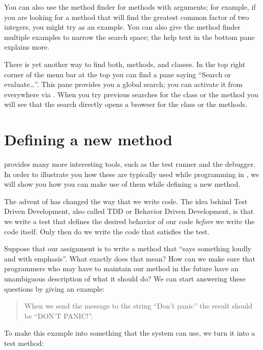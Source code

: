 \documentclass[a4paper,10pt,twoside]{book}
\begin{document}
You can also use the method finder for methods with arguments; for example, if you are looking for a method that will find the greatest common factor of two integers, you might try  as an example.
You can also give the method finder multiple examples to narrow the search space; the help text in the bottom pane explains more.

There is yet another way to find both, methods, and classes.
In the top right corner of the menu bar at the top you can find a pane saying ``Search or evaluate\ldots''.
This pane provides you a global search; you can activate it from everywhere via .
When you try previous searches for the class  or the method  you will see that the search directly opens a browser for the class or the methods.

\section{Defining a new method}

\sq provides many more interesting tools, such as the test runner and the debugger.
In order to illustrate you how these are typically used while programming in \sq, we will show you how you can make use of them while defining a new method.

The advent of \cite{Beck03a} has changed the way that we write code.
The idea behind Test Driven Development, also called TDD or Behavior Driven Development, is that we write a test that defines the desired behavior of our code \emph{before} we write the code itself.
Only then do we write the code that satisfies the test.

Suppose that our assignment is to write a method that ``says something loudly and with emphasis''.
What exactly does that mean?
How can we make sure that programmers who may have to maintain our method in the future have an unambiguous description of what it should do?
We can start answering these questions by giving an example:

\begin{quote}
When we send the message  to the string ``Don't panic'' the result should be ``DON'T PANIC!''.
\end{quote}

\noindent
To make this example into something that the system can use, we turn it into a test method:
\end{document}

